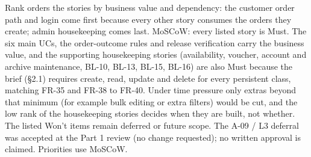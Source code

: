 Rank orders the stories by business value and dependency: the customer order path and login come first because every other story consumes the orders they create; admin housekeeping comes last. MoSCoW: every listed story is Must. The six main UCs, the order-outcome rules and release verification carry the business value, and the supporting housekeeping stories (availability, voucher, account and archive maintenance, BL-10, BL-13, BL-15, BL-16) are also Must because the brief (\S{}2.1) requires create, read, update and delete for every persistent class, matching FR-35 and FR-38 to FR-40. Under time pressure only extras beyond that minimum (for example bulk editing or extra filters) would be cut, and the low rank of the housekeeping stories decides when they are built, not whether. The listed Won't items remain deferred or future scope. The A-09 / L3 deferral was accepted at the Part 1 review (no change requested); no written approval is claimed. Priorities use MoSCoW.

